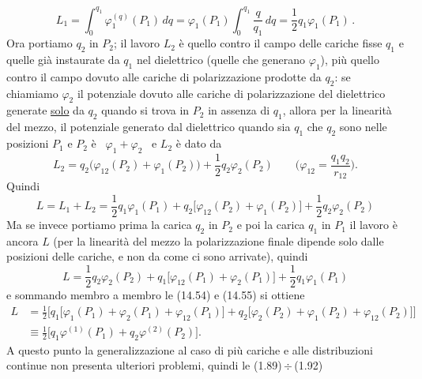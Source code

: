 \begin{equation}
  L_1=\int_0^{q_1}\varphi_1^{(q)}(P_1)\,dq
  =\varphi_1(P_1)\int_0^{q_1}\frac{q}{q_1}\,dq=\frac{1}{2}q_1\varphi_1(P_1)\,.
  \tag{14.52}
\end{equation}
Ora portiamo $q_2$ in $P_2$; il lavoro $L_2$ \`e quello contro il campo delle
cariche fisse $q_1$ e quelle gi\`a instaurate da $q_1$ nel dielettrico (quelle
che generano $\varphi_1$), pi\`u quello contro il campo dovuto alle cariche di
polarizzazione prodotte da $q_2$: se chiamiamo $\varphi_2$ il potenziale dovuto
alle cariche di polarizzazione del dielettrico generate \underline{solo} da
$q_2$ quando si trova in $P_2$ in assenza di $q_1$, allora per la linearit\`a
del mezzo, il potenziale generato dal dielettrico quando sia $q_1$ che $q_2$
sono nelle posizioni $P_1$ e $P_2$ \`e \ $\varphi_1+\varphi_2$ \ e $L_2$ \`e
dato da
\begin{equation}
  L_2=q_2\big(\varphi_{12}(P_2)+\varphi_1(P_2)\big)+\frac{1}{2}q_2\varphi_2(P_2)
  \qquad\Big(\varphi_{12}=\frac{q_1q_2}{r_{12}}\Big).
  \tag{14.53}
\end{equation}
Quindi
\begin{equation}
  L=L_1+L_2=\frac{1}{2}q_1\varphi_1(P_1)
  +q_2\big[\varphi_{12}(P_2)+\varphi_1(P_2)\big]+\frac{1}{2}q_2\varphi_2(P_2)
  \tag{14.54}
\end{equation}
Ma se invece portiamo prima la carica $q_2$ in $P_2$ e poi la carica $q_1$ in
$P_1$ il lavoro \`e ancora $L$ (per la linearit\`a del mezzo la polarizzazione
finale dipende solo dalle posizioni delle cariche, e non da come ci sono
arrivate), quindi
\begin{equation}
  L=\frac{1}{2}q_2\varphi_2(P_2)
  +q_1\big[\varphi_{12}(P_1)+\varphi_2(P_1)\big]+\frac{1}{2}q_1\varphi_1(P_1)
  \tag{14.55}
\end{equation}
e sommando membro a membro le (14.54) e (14.55) si ottiene
\begin{equation}
  \begin{aligned}
    L&=\frac{1}{2}\Big[
    q_1\big[\varphi_1(P_1)+\varphi_2(P_1)+\varphi_{12}(P_1)\big]
    +q_2\big[\varphi_2(P_2)+\varphi_1(P_2)+\varphi_{12}(P_2)\big]\Big]\\
    &\equiv\frac{1}{2}\big[q_1\varphi^{(1)}(P_1)+q_2\varphi^{(2)}(P_2)\big].
  \end{aligned}
  \tag{14.56}
\end{equation}
A questo punto la generalizzazione al caso di pi\`u cariche e alle distribuzioni
continue non presenta ulteriori problemi, quindi le (1.89)\,$\div$\,(1.92)
